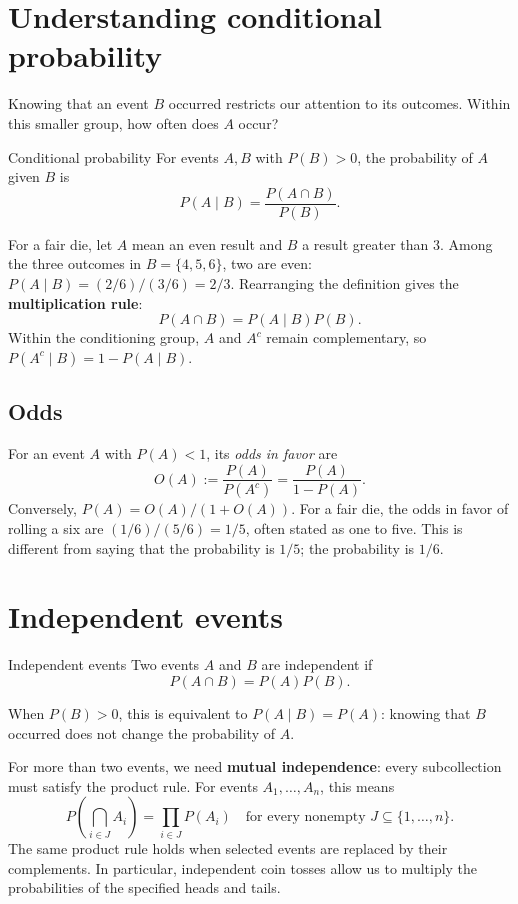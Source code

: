 \documentclass[a4paper,12pt,oneside]{report}
\begin{document}
\section{Understanding conditional probability}

Knowing that an event $B$ occurred restricts our attention to its
outcomes. Within this smaller group, how often does $A$ occur?

\begin{frameddefn}{Conditional probability}
\label{def:conditional-probability}
For events $A,B$ with $P(B)>0$, the probability of $A$ given $B$ is
\[
  P(A\mid B)=\frac{P(A\cap B)}{P(B)}.
\]
\end{frameddefn}

For a fair die, let $A$ mean an even result and $B$ a result greater
than $3$. Among the three outcomes in $B=\{4,5,6\}$, two are even:
$P(A\mid B)=(2/6)/(3/6)=2/3$.
Rearranging the definition gives the \textbf{multiplication rule}:
\[
  P(A\cap B)=P(A\mid B)P(B).
\]
Within the conditioning group, $A$ and $A^c$ remain complementary,
so $P(A^c\mid B)=1-P(A\mid B)$.

\subsection{Odds}

For an event $A$ with $P(A)<1$, its \emph{odds in favor} are
\[
  O(A):=\frac{P(A)}{P(A^c)}
      =\frac{P(A)}{1-P(A)}.
\]
Conversely, $P(A)=O(A)/(1+O(A))$. For a fair die, the odds in
favor of rolling a six are $(1/6)/(5/6)=1/5$, often stated as
one to five. This is different from saying that the probability
is $1/5$; the probability is $1/6$.

\section{Independent events}
\begin{frameddefn}{Independent events}
\label{def:independent-events}
Two events $A$ and $B$ are independent if
\[
  P(A\cap B)=P(A)P(B).
\]
\end{frameddefn}
When $P(B)>0$, this is equivalent to $P(A\mid B)=P(A)$:
knowing that $B$ occurred does not change the probability of $A$.

For more than two events, we need \textbf{mutual independence}:
every subcollection must satisfy the product rule. For events
$A_1,\ldots,A_n$, this means
\[
  P\left(\bigcap_{i\in J}A_i\right)
    =\prod_{i\in J}P(A_i)
  \quad\text{for every nonempty }J\subseteq\{1,\ldots,n\}.
\]
The same product rule holds when selected events are replaced by
their complements. In particular, independent coin tosses allow
us to multiply the probabilities of the specified heads and tails.
\end{document}
